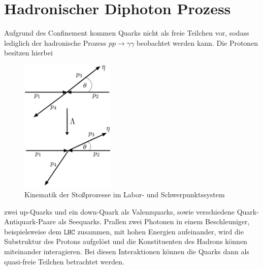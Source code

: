 \section{Hadronischer Diphoton Prozess}
Aufgrund des Confinement kommen Quarks nicht als freie Teilchen vor, sodass lediglich der hadronische Prozess $pp \rightarrow \gamma \gamma$ beobachtet werden kann.  Die Protonen besitzen hierbei
\begin{figure}
	\includegraphics[width=45mm]{graphics/Kinematik}
	\caption{Kinematik der Stoßprozesse im Labor- und Schwerpunktssystem}
	\label{Kinematik}
\end{figure}
 zwei up-Quarks und ein down-Quark als Valenzquarks, sowie verschiedene Quark-Antiquark-Paare als Seequarks. Prallen zwei Photonen in einem Beschleuniger, beispielsweise dem $\texttt{LHC}$ zusammen, mit hohen Energien aufeinander, wird die Substruktur des Protons aufgelöst und die Konstituenten des Hadrons können miteinander interagieren. Bei diesen Interaktionen können die Quarks dann als quasi-freie Teilchen betrachtet werden.

